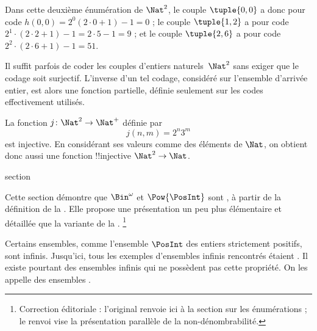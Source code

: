 \documentclass[11pt,a4paper,openany]{memoir}
\begin{document}
\begin{explain}
Dans cette deuxième énumération de $\Nat^2$, le couple
$\tuple{0,0}$ a donc pour code $h(0,0) = 2^0(2\cdot 0+1) - 1 = 0$ ;
le couple $\tuple{1,2}$ a pour code $2^{1} \cdot (2 \cdot 2 + 1) - 1 = 2
\cdot 5 - 1 = 9$ ; et le couple $\tuple{2,6}$ a pour code
$2^{2} \cdot (2 \cdot 6 + 1) - 1 = 51$.
\end{explain}

Il suffit parfois de coder les couples d’entiers naturels~$\Nat^2$
sans exiger que le codage soit surjectif. L’inverse d’un tel codage,
considéré sur l’ensemble d’arrivée entier, est alors une fonction
partielle, définie seulement sur les codes effectivement utilisés.

\begin{ex}
La fonction $j\colon \Nat^2 \to \Nat^+$ définie par
\[
j(n,m) = 2^n3^m
\]
est injective. En considérant ses valeurs comme des éléments de
$\Nat$, on obtient donc aussi une fonction !!{injective}
$\Nat^2 \to \Nat$.
\end{ex}


\endgroup



\begingroup
\expandafter\def\csname ol@sectioncs\endcsname{section}
\def\olfilename{non-enumerability}




\begin{editorial}
Cette section démontre que $\Bin^\omega$ et $\Pow{\PosInt}$ sont
, à partir de la définition de
la . Elle propose une présentation un peu plus
élémentaire et détaillée que la variante de la .
\footnote{Correction éditoriale : l’original renvoie ici à la section
sur les énumérations ; le renvoi vise la présentation parallèle
de la non-dénombrabilité.}
\end{editorial}

Certains ensembles, comme l’ensemble $\PosInt$ des entiers
strictement positifs, sont infinis. Jusqu’ici, tous les exemples
d’ensembles infinis rencontrés étaient .
Il existe pourtant des ensembles infinis qui ne possèdent pas
cette propriété. On les appelle des ensembles
\emph{}.
\end{document}
